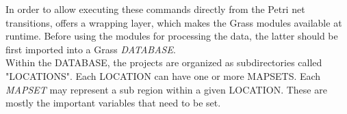 In order to allow \Renew{} executing these commands directly from the Petri net transitions, \RenewGrass{} offers a wrapping layer, which makes the Grass modules available at runtime.
%
Before using the modules for processing the data, the latter should be first imported into a Grass \textit{DATABASE}.\\
%
Within the DATABASE, the projects are organized as subdirectories called "LOCATIONS".
%
Each LOCATION can have one or more MAPSETS. 
%
Each \textit{MAPSET} may represent a sub region within a given LOCATION.
%
These are mostly the important variables that need to be set.




